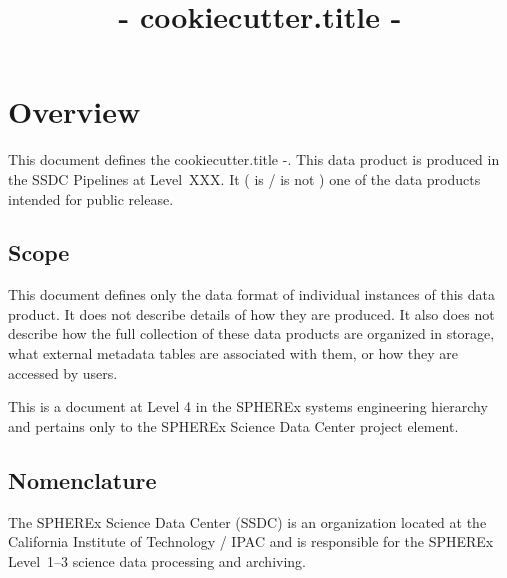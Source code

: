 \documentclass[DP]{spherex}
\title{ {{- cookiecutter.title -}} }
\begin{document}
\maketitle

\begin{dochistory}
\end{dochistory}

\section{Overview}


This document defines the {{ cookiecutter.title -}}.
This data product is produced in the SSDC Pipelines at Level~XXX.
It ( is / is not ) one of the data products intended for public release.

\subsection{Scope}


This document defines only the data format of individual instances of this
data product.
It does not describe details of how they are produced.
It also does not describe how the full collection of these data products are
organized in storage, what external metadata tables are associated with them,
or how they are accessed by users.

This is a document at Level 4 in the SPHEREx systems engineering hierarchy
and pertains only to the SPHEREx Science Data Center project element.

\subsection{Nomenclature}

The SPHEREx Science Data Center (SSDC) is an organization located at
the California Institute of Technology / IPAC and is responsible for the
SPHEREx Level~1--3 science data processing and archiving.

\end{document}
